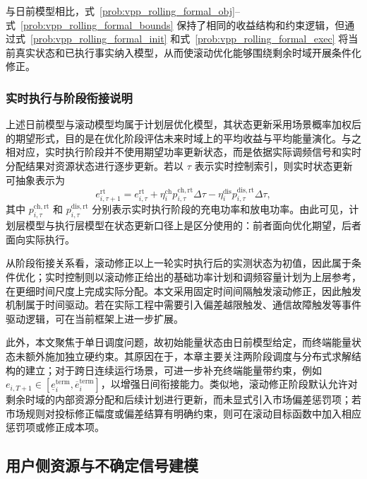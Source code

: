与日前模型相比，式~\eqref{prob:vpp_rolling_formal_obj}--式~\eqref{prob:vpp_rolling_formal_bounds} 保持了相同的收益结构和约束逻辑，但通过式~\eqref{prob:vpp_rolling_formal_init} 和式~\eqref{prob:vpp_rolling_formal_exec} 将当前真实状态和已执行事实纳入模型，从而使滚动优化能够围绕剩余时域开展条件化修正。

\subsubsection{实时执行与阶段衔接说明}
\label{subsubsec:vpp_admm_model_two_stage_realtime}

上述日前模型与滚动模型均属于计划层优化模型，其状态更新采用场景概率加权后的期望形式，目的是在优化阶段评估未来时域上的平均收益与平均能量演化。与之相对应，实时执行阶段并不使用期望功率更新状态，而是依据实际调频信号和实时分配结果对资源状态进行逐步更新。若以 $\tau$ 表示实时控制索引，则实时状态更新可抽象表示为
\begin{equation}
e_{i,\tau+1}^{\mathrm{rt}} = e_{i,\tau}^{\mathrm{rt}} + \eta_i^{\mathrm{ch}} p_{i,\tau}^{\mathrm{ch,rt}} \Delta \tau - \eta_i^{\mathrm{dis}} p_{i,\tau}^{\mathrm{dis,rt}} \Delta \tau,
\end{equation}
其中 $p_{i,\tau}^{\mathrm{ch,rt}}$ 和 $p_{i,\tau}^{\mathrm{dis,rt}}$ 分别表示实时执行阶段的充电功率和放电功率。由此可见，计划层模型与执行层模型在状态更新口径上是区分使用的：前者面向优化期望，后者面向实际执行。

从阶段衔接关系看，滚动修正以上一轮实时执行后的实测状态为初值，因此属于条件优化；实时控制则以滚动修正给出的基础功率计划和调频容量计划为上层参考，在更细时间尺度上完成实际分配。本文采用固定时间间隔触发滚动修正，因此触发机制属于时间驱动。若在实际工程中需要引入偏差越限触发、通信故障触发等事件驱动逻辑，可在当前框架上进一步扩展。

此外，本文聚焦于单日调度问题，故初始能量状态由日前模型给定，而终端能量状态未额外施加独立硬约束。其原因在于，本章主要关注两阶段调度与分布式求解结构的建立；对于跨日连续运行场景，可进一步补充终端能量带约束，例如 $e_{i,T+1}\in[\underline e_i^{\mathrm{term}},\overline e_i^{\mathrm{term}}]$，以增强日间衔接能力。类似地，滚动修正阶段默认允许对剩余时域的内部资源分配和后续计划进行更新，而未显式引入市场偏差惩罚项；若市场规则对投标修正幅度或偏差结算有明确约束，则可在滚动目标函数中加入相应惩罚项或修正成本项。

\subsection{用户侧资源与不确定信号建模}
\label{subsec:vpp_admm_model_user_signal}

